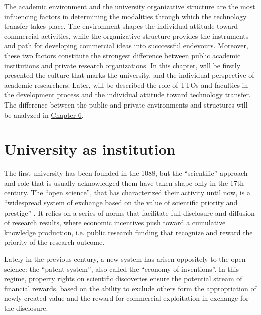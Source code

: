 

\label{Chapter2} %

The academic environment and the university organizative structure are the most influencing factors in determining the modalities through which the technology transfer takes place. The environment shapes the individual attitude toward commercial activities, while the organizative structure provides the instruments and path for developing commercial ideas into succcessful endevours. Moreover, these two factors constitute the strongest difference between public academic institutions and private research organizations. In this chapter, will be firstly presented the culture that marks the university, and the individual perspective of academic researchers. Later, will be described the role of TTOs and faculties in the development process and the individual attitude toward technology transfer. The difference between the public and private environments and structures will be analyzed in \hyperref[Chapter6]{Chapter 6}.

\section{University as institution}
The first university has been founded in the 1088, but the \enquote{scientific} approach and role that is usually acknowledged them have taken shape only in the 17th century. The \enquote{open science}, that has characterized their activity until now, is a \enquote{widespread system of exchange based on the value of scientific priority and prestige} \citep{Murray2005}. It relies on a series of norms that facilitate full disclosure and diffusion of research results, where economic incentives push toward a cumulative knowledge production, i.e. public research funding that recognize and reward the priority of the research outcome.

Lately in the previous century, a new system has arisen oppositely to the open science: the \enquote{patent system}, also called the \enquote{economy of inventions}. In this regime, property rights on scientific discoveries ensure the potential stream of financial rewards, based on the ability to exclude others form the appropriation of newly created value and the reward for commercial exploitation in exchange for the disclosure. 

